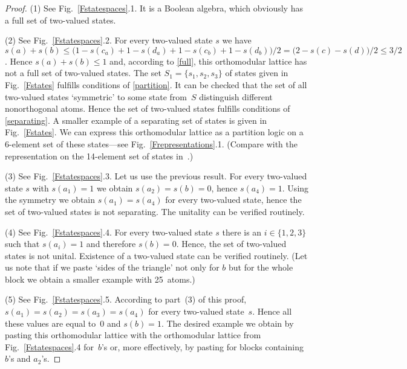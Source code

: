 \begin {proof}
(1) See Fig.~\ref{Fstatespaces}.1. It is a Boolean algebra, which obviously
has a full set of two-valued states.

(2) See Fig.~\ref{Fstatespaces}.2. For every two-valued state $s$ we have
$s(a) + s(b) \le \big(1-s(c_a) + 1-s(d_a) + 1-s(c_b) + 1-s(d_b)\big)/2 =
\big( 2 - s(c) - s(d) \big)/2 \le 3/2$. Hence $s(a)+s(b) \le 1$ and,
according to \ref{full}, this orthomodular lattice has not a full set of
two-valued states. The set $S_1 = \{s_1,s_2,s_3\}$ of states given in
Fig.~\ref{Fstates} fulfills conditions of \ref{partition}. It can be checked
that the set of all two-valued states `symmetric' to some state from~$S$
distinguish different nonorthogonal atoms. Hence the set of two-valued
states fulfills conditions of \ref{separating}. A smaller example of a
separating set of states is given in Fig.~\ref{Fstates}. We can express this
orthomodular lattice as a partition logic on a 6-element set of these
states---see Fig.~\ref{Frepresentations}.1. (Compare with the representation
on the 14-element set of states in~\cite{svosh3}.)

(3) See Fig.~\ref{Fstatespaces}.3. Let us use the previous result. For every
two-valued state $s$ with $s(a_1)=1$ we obtain $s(a_2)=s(b)=0$, hence
$s(a_4)=1$. Using the symmetry we obtain $s(a_1)=s(a_4)$ for every
two-valued state, hence the set of two-valued states is not separating. The
unitality can be verified routinely.

(4) See Fig.~\ref{Fstatespaces}.4. For every two-valued state $s$ there is an
$i \in \{1,2,3\}$ such that $s(a_i)=1$ and therefore $s(b)=0$. Hence, the
set of two-valued states is not unital. Existence of a two-valued state can
be verified routinely. (Let us note that if we paste `sides of the triangle'
not only for $b$ but for the whole block we obtain a smaller example with
25~atoms.)

(5) See Fig.~\ref{Fstatespaces}.5. According to part~(3) of this proof,
$s(a_1) = s(a_2) = s(a_3) = s(a_4)$ for every two-valued state~$s$. Hence
all these values are equal to~0 and $s(b) = 1$. The desired example we
obtain by pasting this orthomodular lattice with the orthomodular lattice
from Fig.~\ref{Fstatespaces}.4 for~$b$'s or, more effectively, by pasting
for blocks containing $b$'s and $a_2$'s.

\end {proof}

